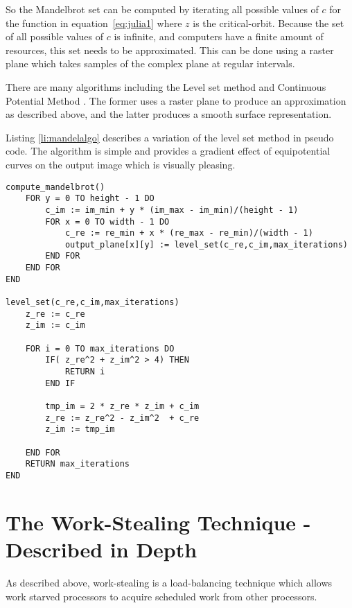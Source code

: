 So the Mandelbrot set can be computed by iterating all possible values of \(c\) for the function in equation~\ref{eq:julia1} where \(z\) is the 
\gls{critical-orbit}. Because the set of all possible values of \(c\) is infinite, and computers have a finite amount of resources, this 
set needs to be approximated. This can be done using a raster plane which takes samples of the complex plane at regular intervals. 

There are many algorithms including the Level set method \cite[p.~188]{fractimg} and Continuous Potential Method \cite[p.~191]{fractimg}.
The former uses a raster plane to produce an approximation as described above, and the latter produces a smooth surface representation.

Listing \ref{li:mandelalgo} describes a variation of the level set method in pseudo code. 
The algorithm is simple and provides a gradient effect of equipotential curves on the output image
which is visually pleasing.

\newpage

\begin{lstlisting}[label = li:mandelalgo, caption = A sequential algorithm to compute the Mandelbrot Set]
compute_mandelbrot()
    FOR y = 0 TO height - 1 DO
        c_im := im_min + y * (im_max - im_min)/(height - 1)
        FOR x = 0 TO width - 1 DO
            c_re := re_min + x * (re_max - re_min)/(width - 1)
            output_plane[x][y] := level_set(c_re,c_im,max_iterations)
        END FOR
    END FOR
END

level_set(c_re,c_im,max_iterations)
    z_re := c_re
    z_im := c_im

    FOR i = 0 TO max_iterations DO
        IF( z_re^2 + z_im^2 > 4) THEN
            RETURN i
        END IF
        
        tmp_im = 2 * z_re * z_im + c_im
        z_re := z_re^2 - z_im^2  + c_re
        z_im := tmp_im
        
    END FOR
    RETURN max_iterations
END
\end{lstlisting}

\section{The Work-Stealing Technique - Described in Depth}
\label{sec:resworkdepth}

As described above, work-stealing is a load-balancing technique which allows work starved processors to acquire scheduled work from other processors. 

